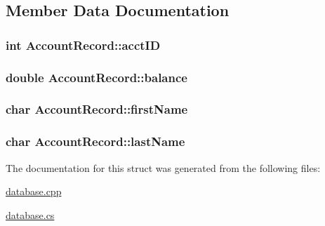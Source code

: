\subsection{Member Data Documentation}
\hypertarget{struct_account_record_a587aa92adcd387d37427cd19c69e5932}{
\subsubsection[{acct\-I\-D}]{\setlength{\rightskip}{0pt plus 5cm}int Account\-Record\-::acct\-I\-D}}\label{struct_account_record_a587aa92adcd387d37427cd19c69e5932}
\hypertarget{struct_account_record_a7de857c68a45702a0c1c4720b4570c2a}{
\subsubsection[{balance}]{\setlength{\rightskip}{0pt plus 5cm}double Account\-Record\-::balance}}\label{struct_account_record_a7de857c68a45702a0c1c4720b4570c2a}
\hypertarget{struct_account_record_a4ba463ed92b46c3ec07f7904001c57e2}{
\subsubsection[{first\-Name}]{\setlength{\rightskip}{0pt plus 5cm}char Account\-Record\-::first\-Name}}\label{struct_account_record_a4ba463ed92b46c3ec07f7904001c57e2}
\hypertarget{struct_account_record_a1d0fe60d57c25aec63b4b2b8008c1fcc}{
\subsubsection[{last\-Name}]{\setlength{\rightskip}{0pt plus 5cm}char Account\-Record\-::last\-Name}}\label{struct_account_record_a1d0fe60d57c25aec63b4b2b8008c1fcc}


The documentation for this struct was generated from the following files\-:\begin{DoxyCompactItemize}
\item 
\hyperlink{database_8cpp}{database.\-cpp}\item 
\hyperlink{database_8cs}{database.\-cs}\end{DoxyCompactItemize}

